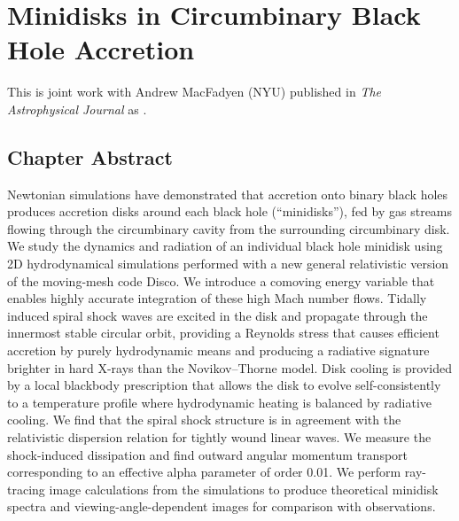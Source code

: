 \renewcommand{\chapid}{minidisk}

\newcommand{\Disco}{{\texttt{Disco}}}
\newcommand{\model}[1]{{Model \texttt{#1}}}


\newcommand{\ave}[1]{\left \langle #1 \right \rangle}
\newcommand{\avet}[1]{ \langle #1 \rangle}
\newcommand{\aveRe}[1]{\left \langle #1 \right \rangle_\text{Re}}
\newcommand{\aveRet}[1]{ \langle #1  \rangle_\text{Re}}


\chapter{Minidisks in Circumbinary Black Hole Accretion}

This \paper is joint work with Andrew MacFadyen (NYU) published in \emph{The Astrophysical Journal} as \citet{Ryan17}.

\section{Chapter Abstract}

Newtonian simulations have demonstrated that accretion onto binary black holes produces accretion disks around each black hole (``minidisks''), fed by gas streams flowing through the circumbinary cavity from the surrounding circumbinary disk. We study the dynamics and radiation of an individual black hole minidisk using 2D hydrodynamical simulations performed with a new general relativistic version of the moving-mesh code Disco. We introduce a comoving energy variable that enables highly accurate integration of these high Mach number flows. Tidally induced spiral shock waves are excited in the disk and propagate through the innermost stable circular orbit, providing a Reynolds stress that causes efficient accretion by purely hydrodynamic means and producing a radiative signature brighter in hard X-rays than the Novikov--Thorne model. Disk cooling is provided by a local blackbody prescription that allows the disk to evolve self-consistently to a temperature profile where hydrodynamic heating is balanced by radiative cooling. We find that the spiral shock structure is in agreement with the relativistic dispersion relation for tightly wound linear waves. We measure the shock-induced dissipation and find outward angular momentum transport corresponding to an effective alpha parameter of order 0.01. We perform ray-tracing image calculations from the simulations to produce theoretical minidisk spectra and viewing-angle-dependent images for comparison with observations.

